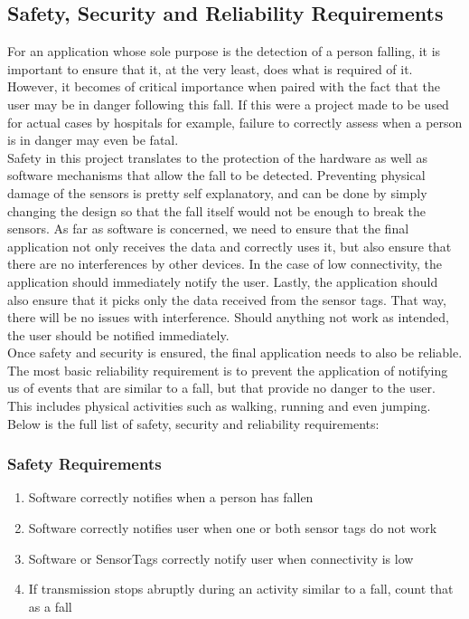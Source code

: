 \documentclass[conference,12pt]{IEEETran}
\begin{document}
\subsection{Safety, Security and Reliability Requirements}
For an application whose sole purpose is the detection of a person falling, it is important to ensure that it, at the very least, does what is required of it. However, it becomes of critical importance when paired with the fact that the user may be in danger following this fall. If this were a project made to be used for actual cases by hospitals for example, failure to correctly assess when a person is in danger may even be fatal. 
\\Safety in this project translates to the protection of the hardware as well as software mechanisms that allow the fall to be detected. Preventing physical damage of the sensors is pretty self explanatory, and can be done by simply changing the design so that the fall itself would not be enough to break the sensors. As far as software is concerned, we need to ensure that the final application not only receives the data and correctly uses it, but also ensure that there are no interferences by other devices. In the case of low connectivity, the application should immediately notify the user. Lastly, the application should also ensure that it picks only the data received from the sensor tags. That way, there will be no issues with interference. Should anything not work as intended, the user should be notified immediately.\\
Once safety and security is ensured, the final application needs to also be reliable. The most basic reliability requirement is to prevent the application of notifying us of events that are similar to a fall, but that provide no danger to the user. This includes physical activities such as walking, running and even jumping. Below is the full list of safety, security and reliability requirements:

\subsubsection{Safety Requirements}

\begin{enumerate}
	\item Software correctly notifies when a person has fallen
	\item Software correctly notifies user when one or both sensor tags do not work
	\item Software or SensorTags correctly notify user when connectivity is low
	\item If transmission stops abruptly during an activity similar to a fall, count that as a fall
\end{enumerate}
\end{document}
